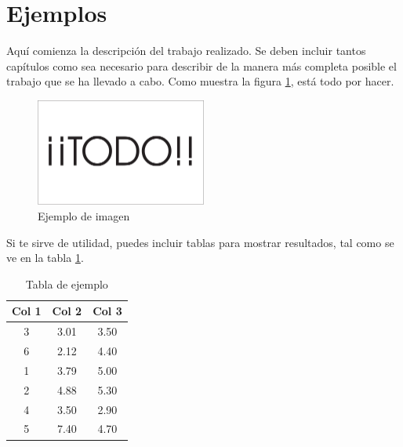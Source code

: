 \section{Ejemplos}
Aquí comienza la descripción del trabajo realizado. Se deben incluir tantos capítulos como sea necesario para describir de la manera más completa posible el trabajo que se ha llevado a cabo. Como muestra la figura \ref{fig:sampleImage}, está todo por hacer.


\begin{figure}[h]
	\centering
	\includegraphics[width = 0.5\textwidth]{Imagenes/Vectorial/Todo.pdf}
	\caption{Ejemplo de imagen}
	\label{fig:sampleImage}
\end{figure}

Si te sirve de utilidad,  puedes incluir tablas para mostrar resultados, tal como se ve en la tabla \ref{tab:sampleTable}.


\begin{table}
	\centering
	\begin{tabular}{c|c|c}
		\textbf{Col 1} & \textbf{Col 2} & \textbf{Col 3} \\
		\hline\hline
		3 & 3.01 & 3.50\\
		6 & 2.12 & 4.40\\
		1 & 3.79 & 5.00\\
		2 & 4.88 & 5.30\\
		4 & 3.50 & 2.90\\
		5 & 7.40 & 4.70\\
		\hline
	\end{tabular}
	\caption{Tabla de ejemplo}
	\label{tab:sampleTable}
\end{table}
